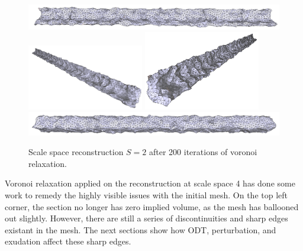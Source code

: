 \documentclass[12pt]{drexelthesis}
\begin{document}
\begin{figure}[!ht]	
	\centering
		\includegraphics[width=5in]{simulated-lab-scan/2cmnoise/optimizedNeat/scalespace2lloyd00.png}
		\includegraphics[width=2in]{simulated-lab-scan/2cmnoise/optimizedNeat/scalespace2lloyd01.png}
		\includegraphics[width=2in]{simulated-lab-scan/2cmnoise/optimizedNeat/scalespace2lloyd02.png}
		\includegraphics[width=5in]{simulated-lab-scan/2cmnoise/optimizedNeat/scalespace2lloyd03.png}
		\caption[Scale space reconstruction $S = 2$ after 200 iterations of voronoi relaxation]{\centering Scale space reconstruction $S = 2$ after 200 iterations of voronoi relaxation.}
	\label{2cmnoise:scalespace2lloyd}
\end{figure}

Voronoi relaxation applied on the reconstruction at scale space 4 has done some work to remedy the highly visible issues with the initial mesh. On the top left corner, the section no longer has zero implied volume, as the mesh has ballooned out slightly. However, there are still a series of discontinuities and sharp edges existant in the mesh. The next sections show how ODT, perturbation, and exudation affect these sharp edges.
\end{document}
